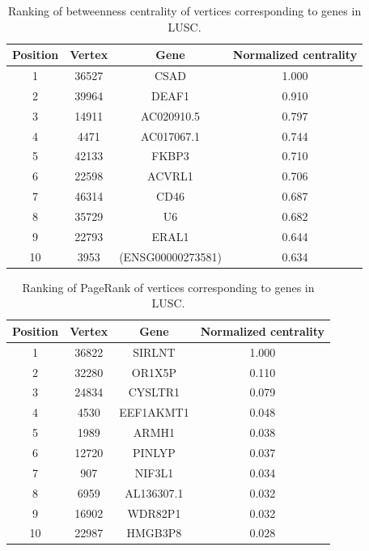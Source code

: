 \documentclass[12pt,a4paper]{report}
\begin{document}
\begin{table}[H]
\centering
\caption{Ranking of betweenness centrality of vertices corresponding to genes in LUSC.}
\label{tab:lusc3}
\begin{tabular}{cccc}
\hline
\textbf{Position}         & \textbf{Vertex}     & \textbf{Gene}   & \textbf{Normalized centrality}   \\
\hline
   1    &36527   &     CSAD            &    1.000        \\
   2      &39964&      DEAF1               &    0.910        \\
   3      &14911  &     AC020910.5                 &           0.797 \\
   4      &4471 &    AC017067.1                  &           0.744 \\
   5  &42133     &    FKBP3                  &0.710            \\
   6      & 22598 &    ACVRL1                  & 0.706           \\
   7       & 46314 &    CD46                  & 0.687           \\
   8       & 35729&     U6                & 0.682           \\
   9       & 22793 &    ERAL1               & 0.644           \\
   10       & 3953 &    (ENSG00000273581)                &           0.634 \\
\hline
\end{tabular}
\end{table}

\begin{table}[H]
\centering
\caption{Ranking of PageRank of vertices corresponding to genes in LUSC.}
\label{tab:lusc4}
\begin{tabular}{cccc}
\hline
\textbf{Position}         & \textbf{Vertex}     & \textbf{Gene}   & \textbf{Normalized centrality}   \\
\hline
   1       &   36822        &   SIRLNT        &  1.000          \\
   2      &     32280      &     OR1X5P      &     0.110       \\
   3       &    24834       &    CYSLTR1       &    0.079        \\
   4       &    4530       &     EEF1AKMT1      &    0.048        \\
   5       &    1989       &   ARMH1        &    0.038        \\
   6       &    12720       &    PINLYP       &    0.037        \\
   7       &    907       &        NIF3L1   &      0.034      \\
   8       &    6959       &      AL136307.1     &   0.032         \\
   9       &     16902      &  WDR82P1         &      0.032      \\
   10       &     22987      &  HMGB3P8         &      0.028      \\
\hline
\end{tabular}
\end{table}
\end{document}
